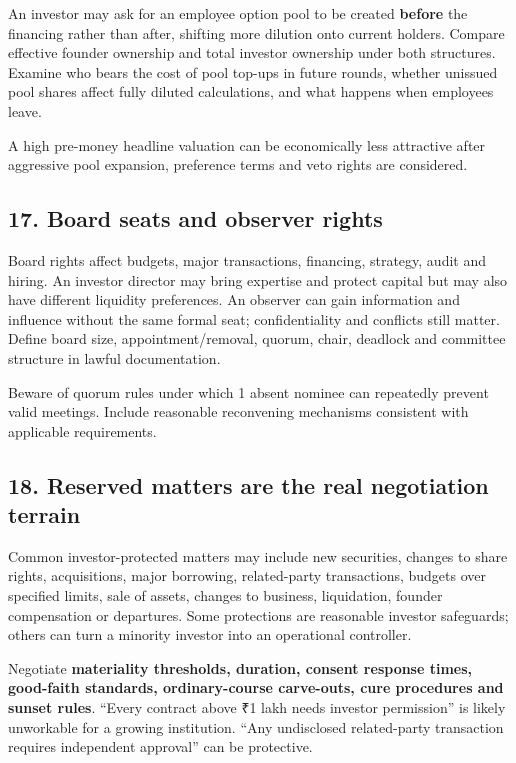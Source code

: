 An investor may ask for an employee option pool to be created \textbf{before} the financing rather than after, shifting more dilution onto current holders. Compare effective founder ownership and total investor ownership under both structures. Examine who bears the cost of pool top-ups in future rounds, whether unissued pool shares affect fully diluted calculations, and what happens when employees leave.

A high pre-money headline valuation can be economically less attractive after aggressive pool expansion, preference terms and veto rights are considered.

\subsection{17. Board seats and observer rights}

Board rights affect budgets, major transactions, financing, strategy, audit and hiring. An investor director may bring expertise and protect capital but may also have different liquidity preferences. An observer can gain information and influence without the same formal seat; confidentiality and conflicts still matter. Define board size, appointment/removal, quorum, chair, deadlock and committee structure in lawful documentation.

Beware of quorum rules under which 1 absent nominee can repeatedly prevent valid meetings. Include reasonable reconvening mechanisms consistent with applicable requirements.

\subsection{18. Reserved matters are the real negotiation terrain}

Common investor-protected matters may include new securities, changes to share rights, acquisitions, major borrowing, related-party transactions, budgets over specified limits, sale of assets, changes to business, liquidation, founder compensation or departures. Some protections are reasonable investor safeguards; others can turn a minority investor into an operational controller.

Negotiate \textbf{materiality thresholds, duration, consent response times, good-faith standards, ordinary-course carve-outs, cure procedures and sunset rules}. ``Every contract above \textnormal{₹}1 lakh needs investor permission'' is likely unworkable for a growing institution. ``Any undisclosed related-party transaction requires independent approval'' can be protective.

